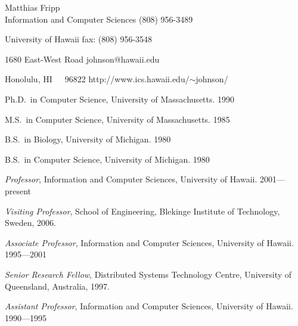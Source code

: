 
\begin{center}
Matthias Fripp \\
Information and Computer Sciences \hfill (808) 956-3489

University of Hawaii              \hfill fax: (808) 956-3548

1680 East-West Road               \hfill johnson@hawaii.edu

Honolulu, HI~~~96822              \hfill http://www.ics.hawaii.edu/$\sim$johnson/

\end{center}

\begin{Professional Preparation}
\item Ph.D.~in Computer Science, University of Massachusetts. 1990 
\item M.S.~in Computer Science, University of Massachusetts.  1985
\item B.S.~in Biology, University of Michigan. 1980
\item B.S.~in Computer Science, University of Michigan. 1980
\end{Professional Preparation}

\begin{Appointments}
\item {\em Professor},  Information and Computer Sciences, University of Hawaii.  2001---present
\item {\em Visiting Professor}, School of Engineering, Blekinge Institute of Technology, Sweden, 2006.
\item {\em Associate Professor},  Information and Computer Sciences, University of Hawaii.  1995---2001
\item {\em Senior Research Fellow},  Distributed Systems Technology Centre, University of Queensland, Australia, 1997.
\item {\em Assistant Professor},   Information and Computer Sciences, University of Hawaii.  1990---1995
\end{Appointments}


